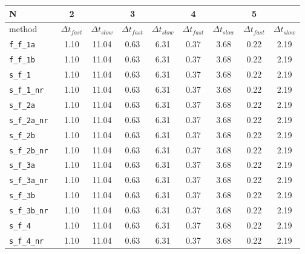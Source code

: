 \begin{tabular}{l|cc|cc|cc|cc}
N& 2  &  & 3  &  & 4  &  & 5  &  \\
\hline
method& $\Delta t_{fast}$  & $\Delta t_{slow}$& $\Delta t_{fast}$  & $\Delta t_{slow}$& $\Delta t_{fast}$  & $\Delta t_{slow}$& $\Delta t_{fast}$  & $\Delta t_{slow}$\\
\hline
\verb|f_f_1a | & 1.10 & 11.04 & 0.63 & 6.31 & 0.37 & 3.68 & 0.22 & 2.19 \\
\verb|f_f_1b | & 1.10 & 11.04 & 0.63 & 6.31 & 0.37 & 3.68 & 0.22 & 2.19 \\
\verb|s_f_1 | & 1.10 & 11.04 & 0.63 & 6.31 & 0.37 & 3.68 & 0.22 & 2.19 \\
\verb|s_f_1_nr | & 1.10 & 11.04 & 0.63 & 6.31 & 0.37 & 3.68 & 0.22 & 2.19 \\
\verb|s_f_2a | & 1.10 & 11.04 & 0.63 & 6.31 & 0.37 & 3.68 & 0.22 & 2.19 \\
\verb|s_f_2a_nr | & 1.10 & 11.04 & 0.63 & 6.31 & 0.37 & 3.68 & 0.22 & 2.19 \\
\verb|s_f_2b | & 1.10 & 11.04 & 0.63 & 6.31 & 0.37 & 3.68 & 0.22 & 2.19 \\
\verb|s_f_2b_nr | & 1.10 & 11.04 & 0.63 & 6.31 & 0.37 & 3.68 & 0.22 & 2.19 \\
\verb|s_f_3a | & 1.10 & 11.04 & 0.63 & 6.31 & 0.37 & 3.68 & 0.22 & 2.19 \\
\verb|s_f_3a_nr | & 1.10 & 11.04 & 0.63 & 6.31 & 0.37 & 3.68 & 0.22 & 2.19 \\
\verb|s_f_3b | & 1.10 & 11.04 & 0.63 & 6.31 & 0.37 & 3.68 & 0.22 & 2.19 \\
\verb|s_f_3b_nr | & 1.10 & 11.04 & 0.63 & 6.31 & 0.37 & 3.68 & 0.22 & 2.19 \\
\verb|s_f_4 | & 1.10 & 11.04 & 0.63 & 6.31 & 0.37 & 3.68 & 0.22 & 2.19 \\
\verb|s_f_4_nr | & 1.10 & 11.04 & 0.63 & 6.31 & 0.37 & 3.68 & 0.22 & 2.19 \\
\hline
\end{tabular}
